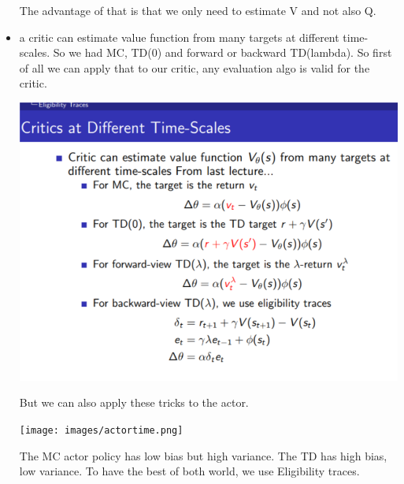 \documentclass[a4paper]{article}
\begin{document}
\begin{itemize}
\begin{center}
    \end{center}
    The advantage of that is that we only need to estimate V and not also Q. 
    \item a critic can estimate value function from many targets at different time-scales. So we had MC, TD(0) and forward or backward TD(lambda). So first of all we can apply that to our critic, any evaluation algo is valid for the critic. 
      \begin{center}
    \includegraphics[width = \textwidth]{images/time.png}
    \end{center}
    But we can also apply these tricks to the actor. 
      \begin{center}
    \texttt{[image: images/actortime.png]}
        \end{center}

    The MC actor policy has low bias but high variance. The TD has high bias, low variance. To have the best of both world, we use Eligibility traces. 
    

\end{itemize}
\end{document}
